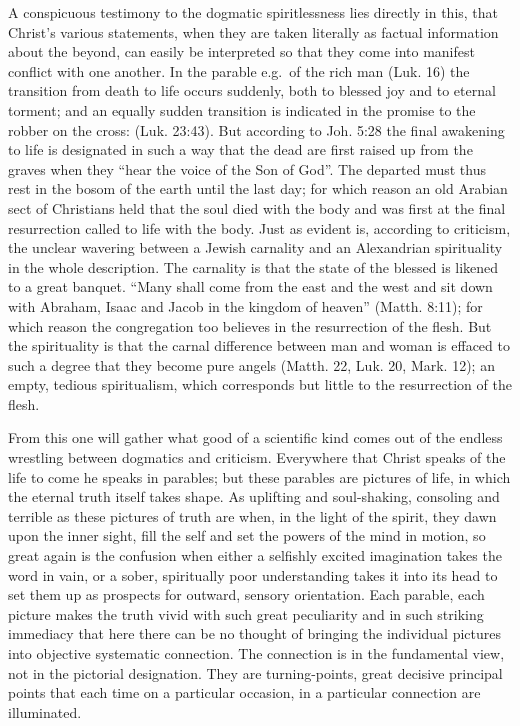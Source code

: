 \documentclass[12pt,a4paper,openany]{book}
\newcommand{\opage}[1]{\marginnote{\footnotesize\textit{[#1]}}}
\begin{document}
A conspicuous testimony to the dogmatic
spiritlessness lies directly in this, that Christ's various
statements, when they are taken literally as factual information
about the beyond, can easily be interpreted so that
they come into manifest conflict with one another.  In the parable
e.g.\ of the rich man (Luk. 16) the transition
from death to life occurs suddenly, both to blessed joy and
to eternal torment; and an equally sudden transition is indicated
in the promise to the robber on the cross: (Luk. 23:43).  But
according to Joh. 5:28 the final awakening to life is
designated in such a way that the dead are first raised up from the graves when
they ``hear the voice of the Son of God''.  The departed must thus
rest in the bosom of the earth until the last day; for which reason
an old Arabian sect of Christians held that the soul
died with the body and was first at the final resurrection
called to life with the body.  Just as evident is,
\setcounter{footnote}{0}%
\opage{218}according to criticism, the unclear wavering between a Jewish
carnality and an Alexandrian spirituality in the whole
description.  The carnality is that the state of the blessed
is likened to a great banquet.  ``Many shall come
from the east and the west and sit down with Abraham,
Isaac and Jacob in the kingdom of heaven'' (Matth. 8:11); for which reason
the congregation too believes in the resurrection of the flesh.
But the spirituality is that the carnal difference between
man and woman is effaced to such a degree that they become
pure angels (Matth. 22, Luk. 20, Mark. 12); an empty,
tedious spiritualism, which corresponds but little to the resurrection of
the flesh.

From this one will gather what good of a scientific kind
comes out of the endless wrestling between dogmatics
and criticism.  Everywhere that Christ speaks of the life to come he speaks in parables; but these parables are
pictures of life, in which the eternal truth itself takes shape.
As uplifting and soul-shaking, consoling and terrible
as these pictures of truth are when, in the light
of the spirit, they dawn upon the inner sight, fill the self and set
the powers of the mind in motion, so great again is the confusion
when either a selfishly excited imagination
takes the word in vain, or a sober, spiritually poor
understanding takes it into its head to set them up as prospects
for outward, sensory orientation.  Each parable, each
picture makes the truth vivid with such great peculiarity
and in such striking immediacy that here
there can be no thought of bringing the individual pictures
into objective systematic connection.  The connection
is in the fundamental view, not in the pictorial designation.
They are turning-points, great decisive principal points that
\setcounter{footnote}{0}%
\opage{219}each time on a particular occasion, in a particular connection
are illuminated.
\end{document}
